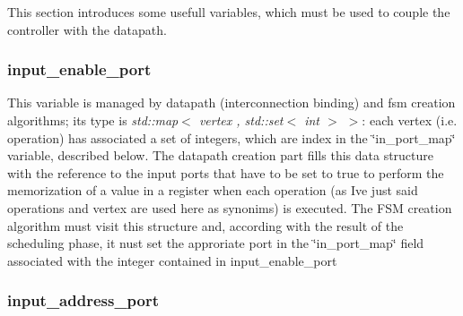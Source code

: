 This section introduces some usefull variables, which must be used to couple the controller with the datapath. \hypertarget{src_HLS_page_input_enable_port}{}\subsubsection{input\+\_\+enable\+\_\+port}\label{src_HLS_page_input_enable_port}
This variable is managed by datapath (interconnection binding) and fsm creation algorithms; its type is {\itshape std\+::map$<$ vertex , std\+::set$<$ int $>$ $>$}\+: each vertex (i.\+e. operation) has associated a set of integers, which are index in the \char`\"{}in\+\_\+port\+\_\+map\char`\"{} variable, described below. The datapath creation part fills this data structure with the reference to the input ports that have to be set to true to perform the memorization of a value in a register when each operation (as I\textquotesingle{}ve just said operations and vertex are used here as synonims) is executed. The F\+SM creation algorithm must visit this structure and, according with the result of the scheduling phase, it nust set the approriate port in the \char`\"{}in\+\_\+port\+\_\+map\char`\"{} field associated with the integer contained in input\+\_\+enable\+\_\+port \hypertarget{src_HLS_page_input_address_port}{}\subsubsection{input\+\_\+address\+\_\+port}\label{src_HLS_page_input_address_port}
